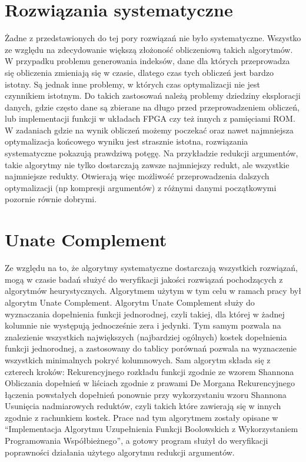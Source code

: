 \section{Rozwiązania systematyczne}

Żadne z przedstawionych do tej pory rozwiązań nie było systematyczne. Wszystko ze względu na zdecydowanie większą złożoność obliczeniową takich algorytmów. W przypadku problemu generowania indeksów, dane dla których przeprowadza się obliczenia zmieniają się w czasie, dlatego czas tych obliczeń jest bardzo istotny. Są jednak inne problemy, w których czas optymalizacji nie jest czynnikiem istotnym. Do takich zastosowań należą problemy dziedziny eksploracji danych, gdzie często dane są zbierane na długo przed przeprowadzeniem obliczeń, lub implementacji funkcji w układach FPGA czy też innych z pamięciami ROM.
W zadaniach gdzie na wynik obliczeń możemy poczekać oraz nawet najmniejsza optymalizacja końcowego wyniku jest strasznie istotna, rozwiązania systematyczne pokazują prawdziwą potęgę. Na przykładzie redukcji argumentów, takie algorytmy nie tylko dostarczają zawsze najmniejszy redukt, ale wszystkie najmniejsze redukty. Otwierają więc możliwość przeprowadzenia dalszych optymalizacji (np kompresji argumentów) z różnymi danymi początkowymi pozornie równie dobrymi.

\section{Unate Complement}

Ze względu na to, że algorytmy systematyczne dostarczają wszystkich rozwiązań, mogą w czasie badań służyć do weryfikacji jakości rozwiązań pochodzących z algorytmów heurystycznych. Algorytmem użytym w tym celu w ramach pracy był algorytm Unate Complement.
Algorytm Unate Complement służy do wyznaczania dopełnienia funkcji jednorodnej, czyli takiej, dla której w żadnej kolumnie nie występują jednocześnie zera i jedynki. Tym samym pozwala na znalezienie wszystkich największych (najbardziej ogólnych) kostek dopełnienia funkcji jednorodnej, a zastosowany do tablicy porównań pozwala na wyznaczenie wszystkich minimalnych pokryć kolumnowych.
Sam algorytm składa się z czterech kroków:
Rekurencyjnego rozkładu funkcji zgodnie ze wzorem Shannona
Obliczania dopełnień w liściach zgodnie z prawami De Morgana
Rekurencyjnego łączenia powstałych dopełnień ponownie przy wykorzystaniu wzoru Shannona
Usunięcia nadmiarowych reduktów, czyli takich które zawierają się w innych zgodnie z rachunkiem kostek.
Prace nad tym algorytmem zostały opisane w “Implementacja Algorytmu Uzupełnienia Funkcji Boolowskich z Wykorzystaniem Programowania Współbieżnego”, a gotowy program służył do weryfikacji poprawności działania użytego algorytmu redukcji argumentów.
